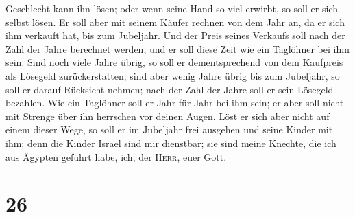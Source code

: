Geschlecht kann ihn lösen; oder wenn seine Hand so viel erwirbt, so soll
er sich selbst lösen.  Er soll aber mit seinem Käufer
rechnen von dem Jahr an, da er sich ihm verkauft hat, bis zum Jubeljahr.
Und der Preis seines Verkaufs soll nach der Zahl der Jahre berechnet
werden, und er soll diese Zeit wie ein Taglöhner bei ihm sein.
 Sind noch viele Jahre übrig, so soll er dementsprechend
von dem Kaufpreis als Lösegeld zurückerstatten;  sind
aber wenig Jahre übrig bis zum Jubeljahr, so soll er darauf Rücksicht
nehmen; nach der Zahl der Jahre soll er sein Lösegeld bezahlen.
 Wie ein Taglöhner soll er Jahr für Jahr bei ihm sein; er
aber soll nicht mit Strenge über ihn herrschen vor deinen Augen.
 Löst er sich aber nicht auf einem dieser Wege, so soll
er im Jubeljahr frei ausgehen und seine Kinder mit ihm; 
denn die Kinder Israel sind mir dienstbar; sie sind meine Knechte, die
ich aus Ägypten geführt habe, ich, der \textsc{Herr}, euer Gott.

\hypertarget{section-25}{%
\section{26}\label{section-25}}

